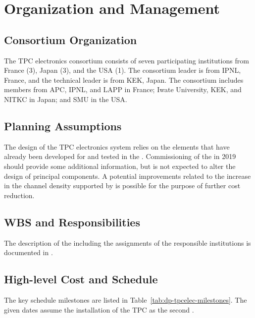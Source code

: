 \section{Organization and Management}
\label{sec:dp-tpcelec-org}

\subsection{Consortium Organization}
\label{ssec:dp-tpcelec-org-consortium}
The \dual TPC electronics consortium consists of seven participating institutions from France (\num{3}), Japan (\num{3}), and the USA (\num{1}). The consortium leader is from IPNL, France, and the technical leader is from KEK, Japan. The consortium includes members from APC, IPNL, and LAPP in France; Iwate University, KEK, and NITKC in Japan; and SMU in the USA.

\subsection{Planning Assumptions}
\label{ssec:dp-tpcelec-org-assmp}
The design of the \dual TPC electronics system relies on the elements that have already been developed for  and tested in the .  Commissioning of the  in 2019 should provide some additional information, but is not expected to alter the design of principal components. A potential improvements related to the increase in the channel density supported by   is possible for the purpose of further cost reduction. 

\subsection{WBS and Responsibilities}
\label{ssec:dp-tpcelec-org-wbs}
The description of the  including the assignments of the responsible institutions is documented in .

\subsection{High-level Cost and Schedule}
\label{ssec:dp-tpcelec-org-cs}
The key schedule milestones are listed in Table~\ref{tab:dp-tpcelec-milestones}. The given dates assume the installation of the \dual TPC as the second  .

